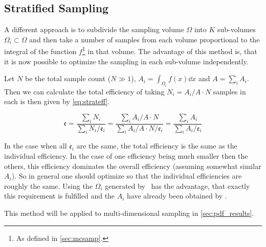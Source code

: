 \subsection{Stratified Sampling}
\label{sec:stratsamp-real}

A different approach is to subdivide the sampling volume \(\Omega\)
into \(K\) sub-volumes \(\Omega_i\subset\Omega\) and then take a
number of samples from each volume proportional to the integral of the
function \(f\)\footnote{As defined in \cref{sec:mcsamp}.} in that
volume. The advantage of this method is, that it is now possible to
optimize the sampling in each sub-volume independently.

Let \(N\) be the total sample count (\(N\gg 1\)),
\(A_i = \int_{\Omega_i}f(x)\dd{x}\) and \(A=\sum_iA_i\).
Then we can calculate the total efficiency of taking \(N_i=A_i/A \cdot N\)
samples in each is then given by \cref{eq:strateff}.

\begin{equation}
  \label{eq:strateff}
  \mathfrak{e} = \frac{\sum_i N_i}{\sum_i N_i/\mathfrak{e}_i} =
  \frac{\sum_i A_i/A\cdot N}{\sum_i A_i/A\cdot N/ \mathfrak{e}_i} = \frac{\sum_i A_i}{\sum_i A_i/\mathfrak{e}_i}
\end{equation}

In the case when all \(\mathfrak{e}_i\) are the same, the total
efficiency is the same as the individual efficiency. In the case of
one efficiency being much smaller then the others, this efficiency
dominates the overall efficiency (assuming somewhat similar
\(A_i\)). So in general one should optimize so that the individual
efficiencies are roughly the same. Using the \(\Omega_i\) generated by
\vegas\ has the advantage, that exactly this requirement is fulfilled
and the \(A_i\) have already been obtained by \vegas.

This method will be applied to multi-dimensional sampling in
\cref{sec:pdf_results}.

